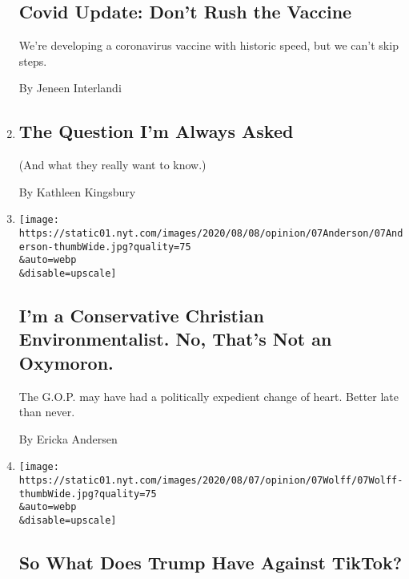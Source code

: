 \begin{enumerate}
{  \subsection{Covid Update: Don't Rush the
  Vaccine}\label{covid-update-dont-rush-the-vaccine}}

  We're developing a coronavirus vaccine with historic speed, but we
  can't skip steps.

  By Jeneen Interlandi
\item
  \href{/2020/08/07/opinion/the-question-im-always-asked.html}{}

  \hypertarget{the-question-im-always-asked}{%
  \subsection{The Question I'm Always
  Asked}\label{the-question-im-always-asked}}

  (And what they really want to know.)

  By Kathleen Kingsbury
\item
  \href{/2020/08/07/opinion/republicans-climate-change.html}{}

  \texttt{[image: https://static01.nyt.com/images/2020/08/08/opinion/07Anderson/07Anderson-thumbWide.jpg?quality=75\\\&auto=webp\\\&disable=upscale]}

  \hypertarget{im-a-conservative-christian-environmentalist-no-thats-not-an-oxymoron}{%
  \subsection{I'm a Conservative Christian Environmentalist. No, That's
  Not an
  Oxymoron.}\label{im-a-conservative-christian-environmentalist-no-thats-not-an-oxymoron}}

  The G.O.P. may have had a politically expedient change of heart.
  Better late than never.

  By Ericka Andersen
\item
  \href{/2020/08/07/opinion/tiktok-wechat-china-trump-executive-order.html}{}

  \texttt{[image: https://static01.nyt.com/images/2020/08/07/opinion/07Wolff/07Wolff-thumbWide.jpg?quality=75\\\&auto=webp\\\&disable=upscale]}

  \hypertarget{so-what-does-trump-have-against-tiktok}{%
  \subsection{So What Does Trump Have Against
  TikTok?}\label{so-what-does-trump-have-against-tiktok}}


\end{enumerate}
